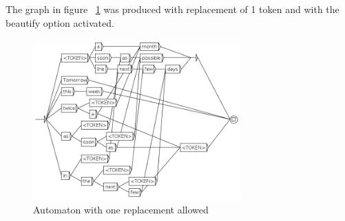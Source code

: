 \bigskip

The graph in figure ~\ref{fig8-7GRF1replace} was produced with replacement of 1 token and with the beautify option activated.
\begin{figure}[h!]
	\begin{center}
		\includegraphics[width=8cm]{resources/img/fig8-7GRF1replace.png}
		\caption{Automaton with one replacement allowed\label{fig8-7GRF1replace}}
	\end{center}
\end{figure}
